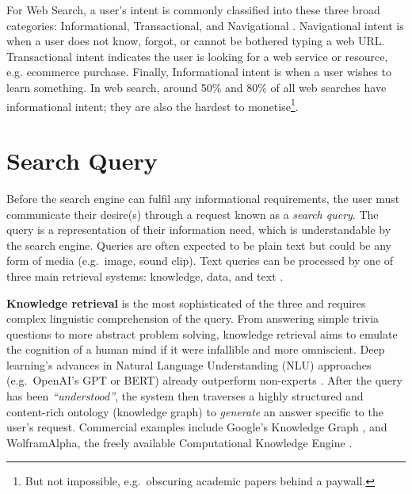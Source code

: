 For Web Search, a user's intent is commonly classified into these three broad categories: Informational, Transactional, and Navigational \cite{broder2002taxonomy}. Navigational intent is when a user does not know, forgot, or cannot be bothered typing a web URL. Transactional intent indicates the user is looking for a web service or resource, e.g. ecommerce purchase. Finally, Informational intent is when a user wishes to learn something. In web search, around 50\% \cite{broder2002taxonomy} and 80\% \cite{jansen2008determining} of all web searches have informational intent; they are also the hardest to monetise\footnote{But not impossible, e.g.\ obscuring academic papers behind a paywall.}.


\section{Search Query}
Before the search engine can fulfil any informational requirements, the user must communicate their desire(s) through a request known as a \textit{search query}. The query is a representation of their information need, which is understandable by the search engine. Queries are often expected to be plain text but could be any form of media (e.g.\ image, sound clip). Text queries can be processed by one of three main retrieval systems: knowledge, data, and text \cite{lewis1996natural}.

\textbf{Knowledge retrieval} is the most sophisticated of the three and requires complex linguistic comprehension of the query. From answering simple trivia questions to more abstract problem solving, knowledge retrieval aims to emulate the cognition of a human mind if it were infallible and more omniscient. Deep learning's advances in Natural Language Understanding (NLU) approaches (e.g.\ OpenAI's GPT or BERT) already outperform non-experts \cite{wang2019superglue}. After the query has been \textit{``understood''}, the system then traverses a highly structured and content-rich ontology (knowledge graph) to \textit{generate} an answer specific to the user's request. Commercial examples include Google's Knowledge Graph \cite{singhal2012introducing}, and WolframAlpha, the freely available Computational Knowledge Engine \cite{wolfram2012wolframalpha}.


